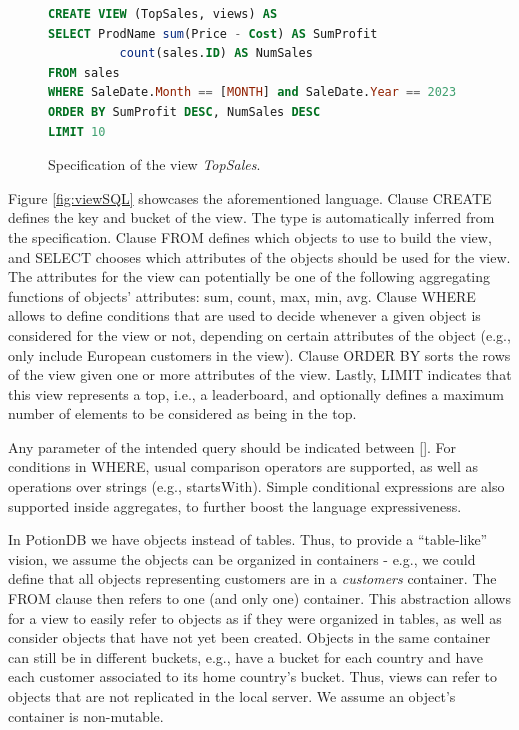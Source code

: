 \documentclass[sigplan,10pt]{acmart}
\newcommand{\qcr}[1]{{\fontfamily{qcr}\selectfont #1}}
\newcommand{\carla}[1]{\nbnote{Carla}{green}{#1}}
\begin{document}
\begin{figure}[t]
\small{
\begin{lstlisting}[language=SQL]
CREATE VIEW (TopSales, views) AS 
SELECT ProdName sum(Price - Cost) AS SumProfit
	      count(sales.ID) AS NumSales 
FROM sales 
WHERE SaleDate.Month == [MONTH] and SaleDate.Year == 2023
ORDER BY SumProfit DESC, NumSales DESC 
LIMIT 10
\end{lstlisting}}
	\caption{Specification of the view \emph{TopSales}.}
	\label{fig:topSalesSQL}
\end{figure}

Figure \ref{fig:viewSQL} showcases the aforementioned language.
Clause \qcr{CREATE} defines the key and bucket of the view.
The type is automatically inferred from the specification.
Clause \qcr{FROM} defines which objects to use to build the view, and \qcr{SELECT} chooses which attributes of the objects should be used for the view.
The attributes for the view can potentially be one of the following aggregating functions of objects' attributes: \qcr{sum}, \qcr{count}, \qcr{max}, \qcr{min}, \qcr{avg}.
Clause \qcr{WHERE} allows to define conditions that are used to decide whenever a given object is considered for the view or not, depending on certain attributes of the object (e.g., only include European customers in the view).
Clause \qcr{ORDER BY} sorts the rows of the view given one or more attributes of the view.
Lastly, \qcr{LIMIT} indicates that this view represents a top, i.e., a leaderboard, and optionally defines a maximum number of elements to be considered as being in the top.

Any parameter of the intended query should be indicated between []. 
For conditions in \qcr{WHERE}, usual comparison operators are supported, as well as operations over strings (e.g., \qcr{startsWith}). %
Simple conditional expressions are also supported inside aggregates, to further boost the language expressiveness.	%

In PotionDB we have objects instead of tables.
Thus, to provide a ``table-like'' vision, we assume the objects can be organized in containers - e.g., we could define that all objects representing customers are in a \emph{customers} container.
The \qcr{FROM} clause then refers to one (and only one) container. %
This abstraction allows for a view to easily refer to objects as if they were organized in tables, as well as consider objects that have not yet been created.
Objects in the same container can still be in different buckets, e.g., have a bucket for each country and have each customer associated to its home country's bucket.
Thus, views can refer to objects that are not replicated in the local server.
We assume an object's container is non-mutable. %
\end{document}
